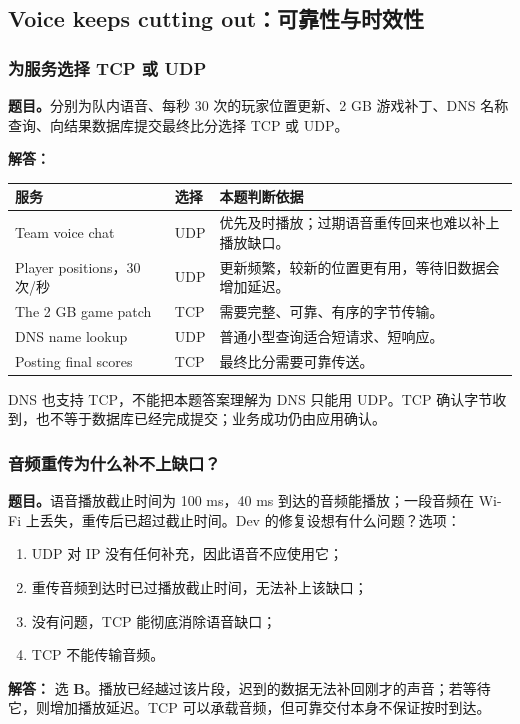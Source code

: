 \documentclass[11pt,a4paper,fontset=fandol]{ctexart}
\renewcommand{\exercisequestion}[2]{%
  \Needspace{5\baselineskip}%
  \subsubsection{#2}\label{exercise:#1}%
}
\renewenvironment{checkedsolution}
  {\par\nopagebreak[4]\textbf{解答：}\ignorespaces}
  {\par}
\begin{document}
\subsection{Voice keeps cutting out：可靠性与时效性}

\exercisequestion{SC2008-HW04-Q03}{为服务选择 TCP 或 UDP}
\textbf{题目。}分别为队内语音、每秒 30 次的玩家位置更新、2 GB 游戏补丁、DNS 名称查询、向结果数据库提交最终比分选择 TCP 或 UDP。
\begin{checkedsolution}
\begin{center}
\small
\begin{tabularx}{\textwidth}{@{}p{4.0cm}lX@{}}
\toprule
服务 & 选择 & 本题判断依据 \\
\midrule
Team voice chat & UDP & 优先及时播放；过期语音重传回来也难以补上播放缺口。 \\
Player positions，30 次/秒 & UDP & 更新频繁，较新的位置更有用，等待旧数据会增加延迟。 \\
The 2 GB game patch & TCP & 需要完整、可靠、有序的字节传输。 \\
DNS name lookup & UDP & 普通小型查询适合短请求、短响应。 \\
Posting final scores & TCP & 最终比分需要可靠传送。 \\
\bottomrule
\end{tabularx}
\end{center}
DNS 也支持 TCP，不能把本题答案理解为 DNS 只能用 UDP。TCP 确认字节收到，也不等于数据库已经完成提交；业务成功仍由应用确认。
\end{checkedsolution}

\exercisequestion{SC2008-HW04-Q04}{音频重传为什么补不上缺口？}
\textbf{题目。}语音播放截止时间为 100 ms，40 ms 到达的音频能播放；一段音频在 Wi-Fi 上丢失，重传后已超过截止时间。Dev 的修复设想有什么问题？选项：
\begin{enumerate}[label=\Alph*.,leftmargin=2.4em]
  \item UDP 对 IP 没有任何补充，因此语音不应使用它；
  \item 重传音频到达时已过播放截止时间，无法补上该缺口；
  \item 没有问题，TCP 能彻底消除语音缺口；
  \item TCP 不能传输音频。
\end{enumerate}
\begin{checkedsolution}
选 \textbf{B}。播放已经越过该片段，迟到的数据无法补回刚才的声音；若等待它，则增加播放延迟。TCP 可以承载音频，但可靠交付本身不保证按时到达。
\end{checkedsolution}
\end{document}
